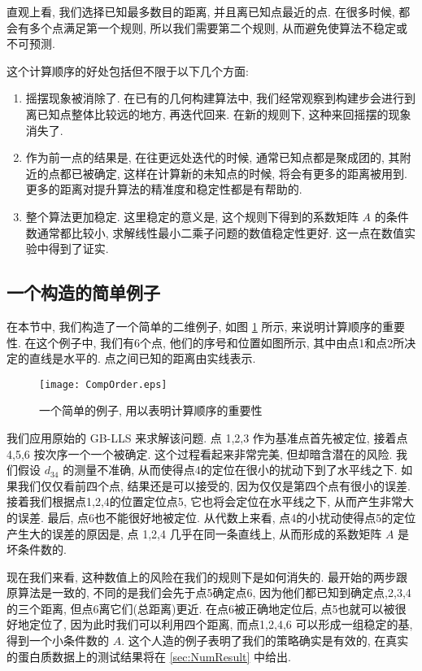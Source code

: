 直观上看, 我们选择已知最多数目的距离, 并且离已知点最近的点.
在很多时候, 都会有多个点满足第一个规则, 所以我们需要第二个规则,
从而避免使算法不稳定或不可预测.

这个计算顺序的好处包括但不限于以下几个方面:
\begin{enumerate}
  \item 摇摆现象被消除了. 在已有的几何构建算法中, 我们经常观察到构建步会进行到离已知点整体比较远的地方, 再迭代回来. 在新的规则下, 这种来回摇摆的现象消失了.
  \item 作为前一点的结果是, 在往更远处迭代的时候, 通常已知点都是聚成团的, 其附近的点都已被确定, 这样在计算新的未知点的时候, 将会有更多的距离被用到. 更多的距离对提升算法的精准度和稳定性都是有帮助的.
  \item 整个算法更加稳定. 这里稳定的意义是, 这个规则下得到的系数矩阵 $A$ 的条件数通常都比较小, 求解线性最小二乘子问题的数值稳定性更好. 这一点在数值实验中得到了证实.
\end{enumerate}

\subsection{一个构造的简单例子}
在本节中, 我们构造了一个简单的二维例子, 如图 \ref{fig:CompOrder} 所示,
来说明计算顺序的重要性.
在这个例子中, 我们有6个点, 他们的序号和位置如图所示,
其中由点1和点2所决定的直线是水平的.
点之间已知的距离由实线表示.

\begin{figure}[htp]
  \centering
  \texttt{[image: CompOrder.eps]}\\
  \caption{一个简单的例子, 用以表明计算顺序的重要性}
  \label{fig:CompOrder}
\end{figure}

我们应用原始的 GB-LLS 来求解该问题. 
点 1,2,3 作为基准点首先被定位, 接着点 4,5,6 按次序一个一个被确定.
这个过程看起来非常完美, 但却暗含潜在的风险.
我们假设 $d_{34}$ 的测量不准确, 从而使得点4的定位在很小的扰动下到了水平线之下.
如果我们仅仅看前四个点, 结果还是可以接受的, 因为仅仅是第四个点有很小的误差. 
接着我们根据点1,2,4的位置定位点5,
它也将会定位在水平线之下, 从而产生非常大的误差.
最后, 点6也不能很好地被定位.
从代数上来看, 点4的小扰动使得点5的定位产生大的误差的原因是,
点 1,2,4 几乎在同一条直线上, 从而形成的系数矩阵 $A$ 是坏条件数的.

现在我们来看, 这种数值上的风险在我们的规则下是如何消失的.
最开始的两步跟原算法是一致的, 不同的是我们会先于点5确定点6,
因为他们都已知到确定点,2,3,4 的三个距离, 但点6离它们(总距离)更近.
在点6被正确地定位后, 点5也就可以被很好地定位了,
因为此时我们可以利用四个距离, 而点1,2,4,6 可以形成一组稳定的基,
得到一个小条件数的 $A$.
这个人造的例子表明了我们的策略确实是有效的, 
在真实的蛋白质数据上的测试结果将在 \ref{sec:NumResult} 中给出.


